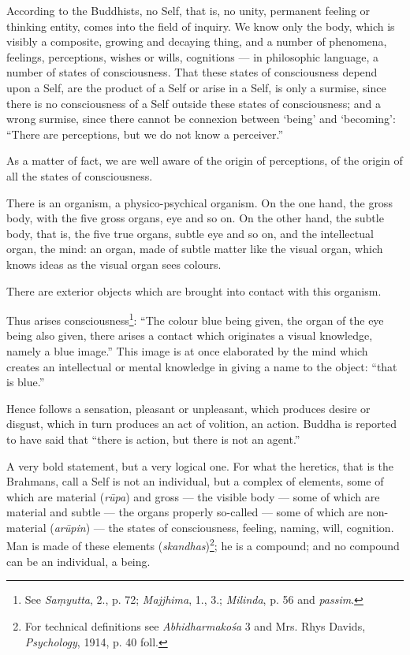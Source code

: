 \documentclass[a4paper, 11pt, oneside, english]{article}
\begin{document}
According to the Buddhists, no Self, that is, no unity, permanent feeling or thinking entity, comes into the field of inquiry. We know only the body, which is visibly a composite, growing and decaying thing, and a number of phenomena, feelings, perceptions, wishes or wills, cognitions --- in philosophic language, a number of states of consciousness. That these states of consciousness depend upon a Self, are the product of a Self or arise in a Self, is only a surmise, since there is no consciousness of a Self outside these states of consciousness; and a wrong surmise, since there cannot be connexion between `being' and `becoming': ``There are perceptions, but we do not know a perceiver.''

As a matter of fact, we are well aware of the origin of perceptions, of the origin of all the states of consciousness.

There is an organism, a physico-psychical organism. On the one hand, the gross body, with the five gross organs, eye and so on. On the other hand, the subtle body, that is, the five true organs, subtle eye and so on, and the intellectual organ, the mind: an organ, made of subtle matter like the visual organ, which knows ideas as the visual organ sees colours.

There are exterior objects which are brought into contact with this organism.

Thus arises consciousness\footnote{See \emph{Saṃyutta}, 2., p. 72; \emph{Majjhima}, 1., 3.; \emph{Milinda}, p. 56 and \emph{passim}.}: ``The colour blue being given, the organ of the eye being also given, there arises a contact which originates a visual knowledge, namely a blue image.'' This image is at once elaborated by the mind which creates an intellectual or mental knowledge in giving a name to the object: ``that is blue.''

Hence follows a sensation, pleasant or unpleasant, which produces desire or disgust, which in turn produces an act of volition, an action. Buddha is reported to have said that ``there is action, but there is not an agent.''

A very bold statement, but a very logical one. For what the heretics, that is the Brahmans, call a Self is not an individual, but a complex of elements, some of which are material (\emph{rūpa}) and gross --- the visible body --- some of which are material and subtle --- the organs properly so-called --- some of which are non-material (\emph{arūpin}) --- the states of consciousness, feeling, naming, will, cognition. Man is made of these elements (\emph{skandhas})\footnote{For technical definitions see \emph{Abhidharmakośa} 3 and Mrs. Rhys Davids, \emph{Psychology}, 1914, p. 40 foll.}; he is a compound; and no compound can be an individual, a being.
\end{document}
